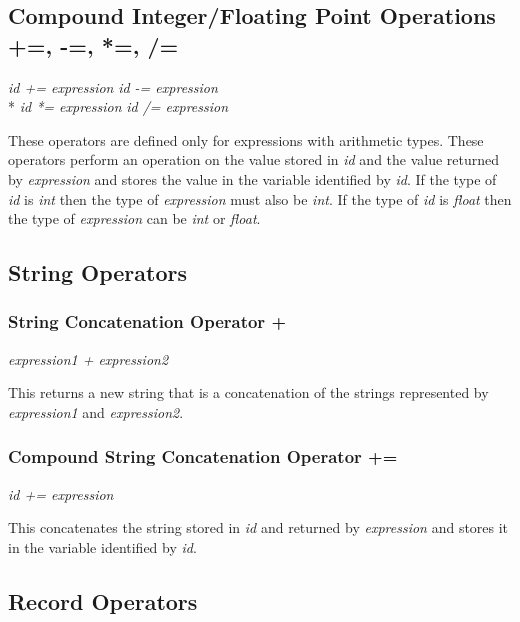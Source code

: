 \subsection{Compound Integer/Floating Point Operations +=, -=, *=, /=}
\begin{center}
\textsl{id += expression}
\textsl{id -= expression}\\*
\textsl{id *= expression}
\textsl{id /= expression}
\end{center}
These operators are defined only for expressions with arithmetic types. These operators perform an 
operation on the value stored in \textsl{id} and the value returned by \textsl{expression} and stores the value
in the variable identified by \textsl{id}. If the type of \textsl{id} is \textsl{int} then the type of  \textsl{expression} 
must also be \textsl{int}.  If the type of \textsl{id} is \textsl{float} then the type of  \textsl{expression} can be \textsl{int} or \textsl{float}.  

\subsection{String Operators}

\subsubsection{String Concatenation Operator + }
\begin{center}
\textsl{expression1 + expression2}
\end{center}
This returns a new string that is a concatenation of the strings represented by 
\textsl{expression1} and \textsl{expression2}.

\subsubsection{Compound String Concatenation Operator += }
\begin{center}
\textsl{id += expression}
\end{center}
This concatenates the string stored in \textsl{id} and returned by \textsl{expression} and stores it in 
the variable identified by \textsl{id}.

\subsection{Record Operators}

